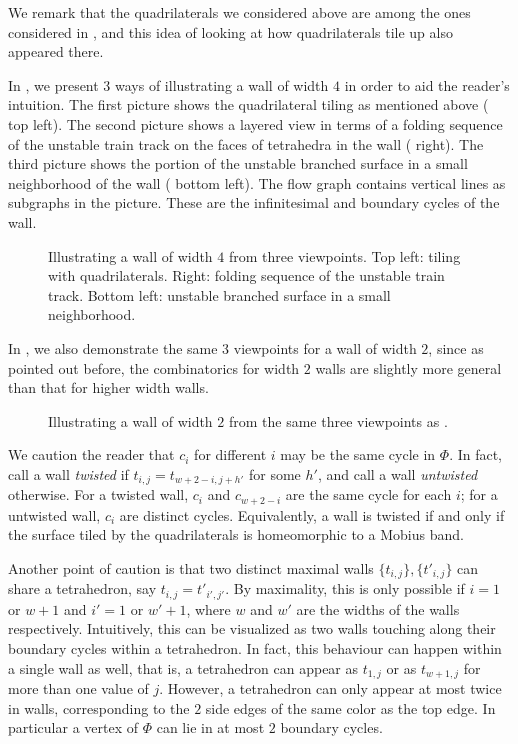 \documentclass[12pt]{amsart}
\theoremstyle{definition}
\numberwithin{equation}{section}
\begin{document}
We remark that the quadrilaterals we considered above are among the ones considered in \cite{HRST11}, and this idea of looking at how quadrilaterals tile up also appeared there.

In , we present 3 ways of illustrating a wall of width $4$ in order to aid the reader's intuition. The first picture shows the quadrilateral tiling as mentioned above ( top left). The second picture shows a layered view in terms of a folding sequence of the unstable train track on the faces of tetrahedra in the wall ( right). The third picture shows the portion of the unstable branched surface in a small neighborhood of the wall ( bottom left). The flow graph contains vertical lines as subgraphs in the picture. These are the infinitesimal and boundary cycles of the wall.

\begin{figure}
    \centering
    \fontsize{14pt}{14pt}\selectfont
    \resizebox{!}{10cm}{}
    \caption{Illustrating a wall of width $4$ from three viewpoints. Top left: tiling with quadrilaterals. Right: folding sequence of the unstable train track. Bottom left: unstable branched surface in a small neighborhood.}
    \label{fig:width4wall}
\end{figure}

In , we also demonstrate the same 3 viewpoints for a wall of width $2$, since as pointed out before, the combinatorics for width $2$ walls are slightly more general than that for higher width walls. 

\begin{figure}
    \centering
    \fontsize{14pt}{14pt}\selectfont
    \resizebox{!}{12cm}{}
    \caption{Illustrating a wall of width $2$ from the same three viewpoints as .}
    \label{fig:width2wall}
\end{figure}

We caution the reader that $c_i$ for different $i$ may be the same cycle in $\Phi$. In fact, call a wall \textit{twisted} if $t_{i,j}=t_{w+2-i,j+h'}$ for some $h'$, and call a wall \textit{untwisted} otherwise. For a twisted wall, $c_i$ and $c_{w+2-i}$ are the same cycle for each $i$; for a untwisted wall, $c_i$ are distinct cycles. Equivalently, a wall is twisted if and only if the surface tiled by the quadrilaterals is homeomorphic to a Mobius band.

Another point of caution is that two distinct maximal walls $\{t_{i,j}\}, \{t'_{i,j}\}$ can share a tetrahedron, say $t_{i,j}=t'_{i',j'}$. By maximality, this is only possible if $i=1$ or $w+1$ and $i'=1$ or $w'+1$, where $w$ and $w'$ are the widths of the walls respectively. Intuitively, this can be visualized as two walls touching along their boundary cycles within a tetrahedron. In fact, this behaviour can happen within a single wall as well, that is, a tetrahedron can appear as $t_{1,j}$ or as $t_{w+1,j}$ for more than one value of $j$. However, a tetrahedron can only appear at most twice in walls, corresponding to the $2$ side edges of the same color as the top edge. In particular a vertex of $\Phi$ can lie in at most $2$ boundary cycles.
\end{document}
